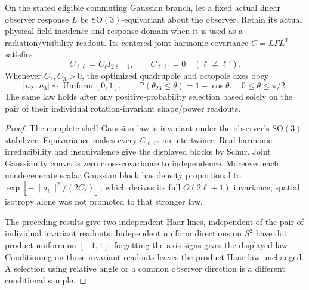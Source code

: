 \documentclass[12pt,a4paper]{article}
\begin{document}
\begin{theorem}
\label{p8:thm:v2189-sky-gaussian-alignment}
On the stated eligible commuting Gaussian branch, let a fixed actual
linear observer response $L$ be $\mathrm{SO}(3)$-equivariant about the
observer. Retain its actual physical field incidence and response domain
when it is used as a radiation/visibility readout. Its centered joint
harmonic covariance $C=L\Gamma L^T$ satisfies
\[
 C_{\ell\ell}=C_\ell I_{2\ell+1},\qquad
 C_{\ell\ell'}=0\quad(\ell\ne\ell').
\]
Whenever $C_2,C_3>0$, the optimized quadrupole and octopole axes obey
\[
 \boxed{|n_2\cdot n_3|\sim\operatorname{Uniform}[0,1],\qquad
 \mathbb P(\theta_{23}\le\theta)=1-\cos\theta,
 \quad0\le\theta\le\pi/2.}
\]
The same law holds after any positive-probability selection based solely
on the pair of their individual rotation-invariant shape/power readouts.
\end{theorem}
\begin{proof}
The complete-shell Gaussian law is invariant under the observer's
$\mathrm{SO}(3)$ stabilizer. Equivariance makes every $C_{\ell\ell'}$
an intertwiner. Real harmonic irreducibility and inequivalence give the
displayed blocks by Schur. Joint Gaussianity converts zero cross-covariance
to independence. Moreover each nondegenerate scalar Gaussian block has
density proportional to $\exp[-\|a_\ell\|^2/(2C_\ell)]$, which derives
its full $O(2\ell+1)$ invariance; spatial isotropy alone was not promoted
to that stronger law.

The preceding results give two independent Haar lines, independent of
the pair of individual invariant readouts. Independent uniform directions
on $S^2$ have dot product uniform on $[-1,1]$; forgetting the axis signs
gives the displayed law. Conditioning on those invariant readouts leaves
the product Haar law unchanged. A selection using relative angle or a
common observer direction is a different conditional sample.
\end{proof}
\end{document}
